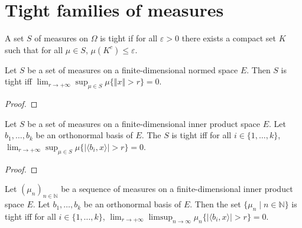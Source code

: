 \chapter{Tight families of measures}

\begin{definition}\label{def:tight}
 \mathlibok
A set $S$ of measures on $\Omega$ is tight if for all $\varepsilon > 0$ there exists a compact set $K$ such that for all $\mu \in S$, $\mu(K^c) \le \varepsilon$.
\end{definition}


\begin{lemma}\label{lem:isTightMeasureSet_iff_norm}
\mathlibok
{}
Let $S$ be a set of measures on a finite-dimensional normed space $E$. 
Then $S$ is tight iff $\lim_{r \to +\infty}\sup_{\mu \in S} \mu\{\Vert x \Vert > r\} = 0$.
\end{lemma}

\begin{proof}\leanok

\end{proof}
	

\begin{lemma}\label{lem:isTightMeasureSet_iff_sup_basis}
\leanok
{}
Let $S$ be a set of measures on a finite-dimensional inner product space $E$. 
Let $b_1, \ldots, b_k$ be an orthonormal basis of $E$.
The $S$ is tight iff for all $i \in \{1, \ldots, k\}$, $\lim_{r \to +\infty}\sup_{\mu \in S} \mu\{\vert\langle b_i, x\rangle\vert > r\} = 0$.
\end{lemma}

\begin{proof}\leanok
{}
\end{proof}


\begin{lemma}\label{lem:isTightMeasureSet_iff_basis}
\leanok
{}
Let $(\mu_n)_{n \in \mathbb{N}}$ be a sequence of measures on a finite-dimensional inner product space $E$. 
Let $b_1, \ldots, b_k$ be an orthonormal basis of $E$.
Then the set $\{\mu_n \mid n \in \mathbb{N}\}$ is tight iff for all $i \in \{1, \ldots, k\}$, $\lim_{r \to +\infty}\limsup_{n \to \infty} \mu_n\{\vert\langle b_i, x\rangle\vert > r\} = 0$.
\end{lemma}

